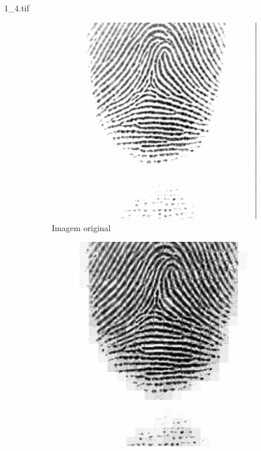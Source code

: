 \documentclass{beamer}
\begin{document}
    \begin{frame}{1\_4.tif}
        \begin{figure}
            \centering
            \begin{subfigure}[!ht]{0.32\textwidth}
                \includegraphics[width=\columnwidth]{Fingerprints/1_4.jpg}
                \caption{Imagem original}
            \end{subfigure}
            \begin{subfigure}[!ht]{0.32\textwidth}
                \includegraphics[width=\columnwidth]{Fingerprints/1_4_intermediate.jpg}

\end{subfigure}
\end{figure}
\end{frame}
\end{document}

